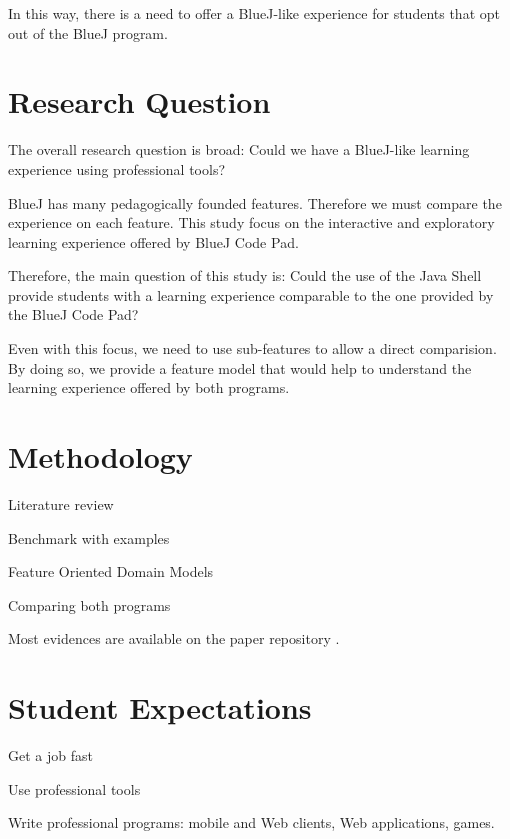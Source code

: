 \documentclass{article}
\begin{document}
In this way, there is a need to offer a BlueJ-like experience for students that opt out of the BlueJ program. 

\section{Research Question}

The overall research question is broad: Could we have a BlueJ-like learning experience using professional tools?

BlueJ has many pedagogically founded features. Therefore we must compare the experience on each feature. This study focus on the interactive and exploratory learning experience offered by BlueJ Code Pad.

Therefore, the main question of this study is:
Could the use of the Java Shell provide students with a learning experience comparable to the one provided by the BlueJ Code Pad?

Even with this focus, we need to use sub-features to allow a direct comparision. By doing so, we provide a feature model that would help to understand the learning experience offered by both programs.




\section{Methodology}

Literature review


Benchmark with examples

Feature Oriented Domain Models

Comparing both programs


Most evidences are available on the paper repository \cite{mangan2025codepadjshell}.

\section{Student Expectations}

Get a job fast

Use professional tools

Write professional programs: mobile and Web clients, Web applications, games.
\end{document}
